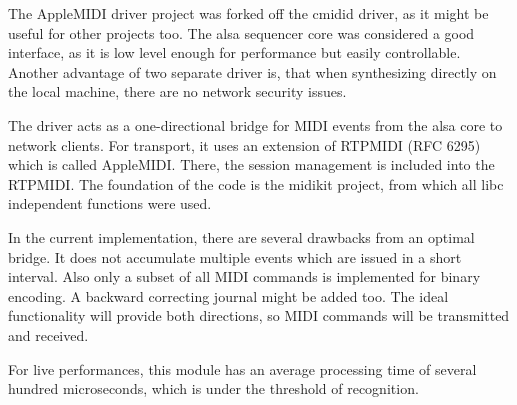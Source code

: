 The AppleMIDI driver project was forked off the cmidid driver, as it might be useful for other projects too. The alsa sequencer core was considered a good interface, as it is low level enough for performance but easily controllable. Another advantage of two separate driver is, that when synthesizing directly on the local machine, there are no network security issues.

The driver acts as a one-directional bridge for MIDI events from the alsa core to network clients.
For transport, it uses an extension of RTPMIDI (RFC 6295) which is called AppleMIDI. There, the session management is included into the RTPMIDI.
The foundation of the code is the midikit project, from which all libc independent functions were used.

In the current implementation, there are several drawbacks from an optimal bridge. It does not accumulate multiple events which are issued in a short interval. Also only a subset of all MIDI commands is implemented for binary encoding. A backward correcting journal might be added too. The ideal functionality will provide both directions, so MIDI commands will be transmitted and received.

For live performances, this module has an average processing time of several hundred microseconds, which is under the threshold of recognition.